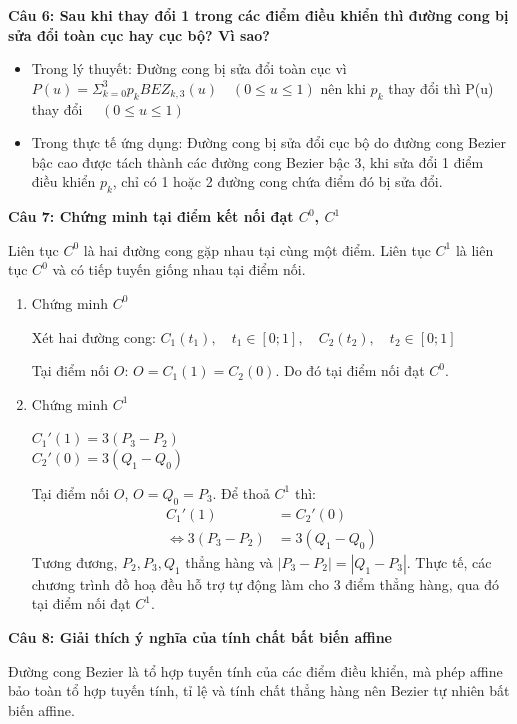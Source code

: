 \textbf{Câu 6: Sau khi thay đổi 1 trong các điểm điều khiển thì đường cong bị sửa đổi toàn cục hay cục bộ? Vì sao?}

\begin{itemize}
	\item Trong lý thuyết: Đường cong bị sửa đổi toàn cục vì $P(u) = \Sigma_{k=0}^{3} p_k BEZ_{k, 3}(u) \quad (0 \le u \le 1)$ nên khi $p_k$ thay đổi thì P(u) thay đổi $\quad (0 \le u \le 1)$
	
	\item Trong thực tế ứng dụng: Đường cong bị sửa đổi cục bộ do đường cong Bezier bậc cao được tách thành các đường cong Bezier bậc 3, khi sửa đổi 1 điểm điều khiển $p_k$, chỉ có 1 hoặc 2 đường cong chứa điểm đó bị sửa đổi.
\end{itemize}

\textbf{Câu 7: Chứng minh tại điểm kết nối đạt $C^0$, $C^1$}

Liên tục $C^0$ là hai đường cong gặp nhau tại cùng một điểm. Liên tục $C^1$ là liên tục $C^0$ và có tiếp tuyến giống nhau tại điểm nối.

\begin{enumerate}
	\item Chứng minh $C^0$
	
	Xét hai đường cong: $C_1(t_1), \quad t_1 \in [0; 1], \quad C_2(t_2), \quad t_2 \in [0; 1]$
	
	Tại điểm nối $O$: $O = C_1(1) = C_2(0)$. Do đó tại điểm nối đạt $C^0$.
	
	\item Chứng minh $C^1$
	
	$C_1'(1) = 3(P_3 - P_2)$\\
	$C_2'(0) = 3(Q_1 - Q_0)$
	
	Tại điểm nối $O$, $O = Q_0 = P_3$. Để thoả $C^1$ thì:
	\begin{align*}
		C_1'(1) &= C_2'(0) \\
		\Leftrightarrow 3(P_3 - P_2) &= 3(Q_1 - Q_0)
	\end{align*}
	Tương đương, $P_2, P_3, Q_1$ thẳng hàng và $|P_3 - P_2| = |Q_1 - P_3|$. Thực tế, các chương trình đồ hoạ đều hỗ trợ tự động làm cho 3 điểm thẳng hàng, qua đó tại điểm nối đạt $C^1$.
\end{enumerate}

\textbf{Câu 8: Giải thích ý nghĩa của tính chất bất biến affine}

Đường cong Bezier là tổ hợp tuyến tính của các điểm điều khiển, mà phép affine bảo toàn tổ hợp tuyến tính, tỉ lệ và tính chất thẳng hàng nên Bezier tự nhiên bất biến affine.

